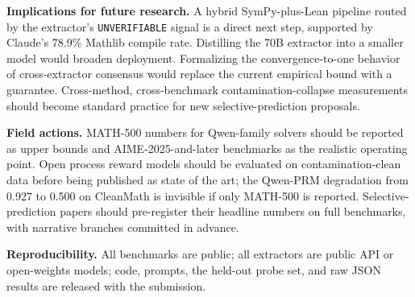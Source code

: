 \documentclass{article}
\begin{document}
\textbf{Implications for future research.} A hybrid SymPy-plus-Lean pipeline routed by the extractor's \texttt{UNVERIFIABLE} signal is a direct next step, supported by Claude's 78.9\% Mathlib compile rate. Distilling the 70B extractor into a smaller model would broaden deployment. Formalizing the convergence-to-one behavior of cross-extractor consensus would replace the current empirical bound with a guarantee. Cross-method, cross-benchmark contamination-collapse measurements should become standard practice for new selective-prediction proposals.

\textbf{Field actions.} MATH-500 numbers for Qwen-family solvers should be reported as upper bounds and AIME-2025-and-later benchmarks as the realistic operating point. Open process reward models should be evaluated on contamination-clean data before being published as state of the art; the Qwen-PRM degradation from 0.927 to 0.500 on CleanMath is invisible if only MATH-500 is reported. Selective-prediction papers should pre-register their headline numbers on full benchmarks, with narrative branches committed in advance.

\textbf{Reproducibility.} All benchmarks are public; all extractors are public API or open-weights models; code, prompts, the held-out probe set, and raw JSON results are released with the submission.



\end{document}
